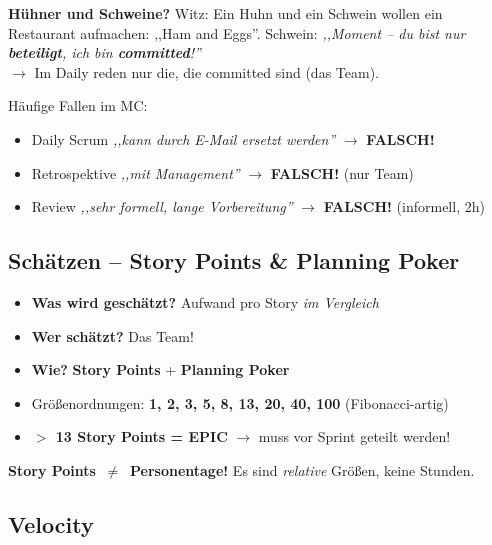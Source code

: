 \documentclass[11pt,a4paper]{article}
\begin{document}
\begin{story}
\textbf{Hühner und Schweine?} Witz: Ein Huhn und ein Schwein wollen ein Restaurant aufmachen: ,,Ham and Eggs''. Schwein: \emph{,,Moment -- du bist nur \textbf{beteiligt}, ich bin \textbf{committed}!''}\\
$\rightarrow$ Im Daily reden nur die, die committed sind (das Team).
\end{story}

\begin{trap}
Häufige Fallen im MC:
\begin{itemize}
  \item Daily Scrum \emph{,,kann durch E-Mail ersetzt werden''} $\rightarrow$ \textbf{FALSCH!}
  \item Retrospektive \emph{,,mit Management''} $\rightarrow$ \textbf{FALSCH!} (nur Team)
  \item Review \emph{,,sehr formell, lange Vorbereitung''} $\rightarrow$ \textbf{FALSCH!} (informell, 2h)
\end{itemize}
\end{trap}

\subsection{Schätzen -- Story Points \& Planning Poker}

\begin{keyfacts}
\begin{itemize}
  \item \textbf{Was wird geschätzt?} Aufwand pro Story \emph{im Vergleich}
  \item \textbf{Wer schätzt?} Das Team!
  \item \textbf{Wie?} \textbf{Story Points} + \textbf{Planning Poker}
  \item Größenordnungen: \textbf{1, 2, 3, 5, 8, 13, 20, 40, 100} (Fibonacci-artig)
  \item \textbf{$>$ 13 Story Points = EPIC} $\rightarrow$ muss vor Sprint geteilt werden!
\end{itemize}
\end{keyfacts}

\begin{merkhilfe}
\textbf{Story Points \,$\neq$\, Personentage!} Es sind \emph{relative} Größen, keine Stunden.
\end{merkhilfe}

\subsection{Velocity}
\end{document}
